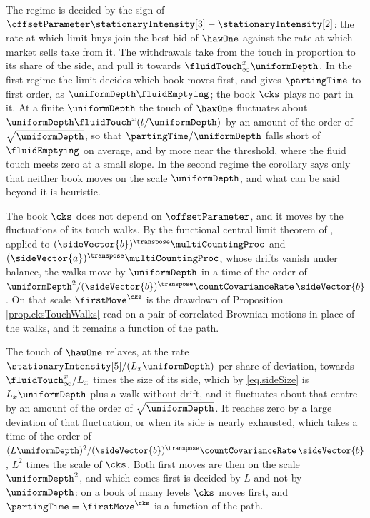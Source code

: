 The regime is decided by the sign of
$\offsetParameter\stationaryIntensity[3] - \stationaryIntensity[2]$:
the rate at which limit buys join the best bid of $\hawOne$
against the rate at which market sells take from it.
The withdrawals take from the touch in proportion to its share of the side,
and pull it towards $\fluidTouch^{x}_{\infty}\uniformDepth$.
In the first regime the limit decides which book moves first,
and gives $\partingTime$ to first order, as $\uniformDepth\fluidEmptying$;
the book $\cks$ plays no part in it.
At a finite $\uniformDepth$
the touch of $\hawOne$ fluctuates about $\uniformDepth\fluidTouch^{x}(t/\uniformDepth)$
by an amount of the order of $\sqrt{\uniformDepth}$,
so that $\partingTime/\uniformDepth$ falls short of $\fluidEmptying$ on average,
and by more near the threshold,
where the fluid touch meets zero at a small slope.
In the second regime the corollary says only that neither book moves on the scale
$\uniformDepth$,
and what can be said beyond it is heuristic.

The book $\cks$ does not depend on $\offsetParameter$,
and it moves by the fluctuations of its touch walks.
By the functional central limit theorem of \cite{BDHM13som},
applied to $(\sideVector{b})^{\transpose}\multiCountingProc$
and $(\sideVector{a})^{\transpose}\multiCountingProc$,
whose drifts vanish under balance,
the walks move by $\uniformDepth$ in a time of the order of
$\uniformDepth^{2} / (\sideVector{b})^{\transpose}\countCovarianceRate\,\sideVector{b}$.
On that scale $\firstMove^{\cks}$ is the drawdown of Proposition \ref{prop.cksTouchWalks}
read on a pair of correlated Brownian motions in place of the walks,
and it remains a function of the path.

The touch of $\hawOne$ relaxes,
at the rate $\stationaryIntensity[5]/(L_x\uniformDepth)$ per share of deviation,
towards $\fluidTouch^{x}_{\infty}/L_x$ times the size of its side,
which by \eqref{eq.sideSize} is $L_x\uniformDepth$ plus a walk without drift,
and it fluctuates about that centre by an amount of the order of $\sqrt{\uniformDepth}$.
It reaches zero by a large deviation of that fluctuation,
or when its side is nearly exhausted,
which takes a time of the order of
$(L\uniformDepth)^{2} / (\sideVector{b})^{\transpose}\countCovarianceRate\,\sideVector{b}$,
$L^{2}$ times the scale of $\cks$.
Both first moves are then on the scale $\uniformDepth^{2}$,
and which comes first is decided by $L$ and not by $\uniformDepth$:
on a book of many levels $\cks$ moves first,
and $\partingTime = \firstMove^{\cks}$ is a function of the path.

